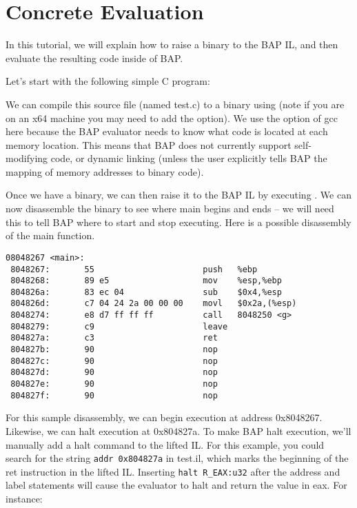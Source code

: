 \section{Concrete Evaluation}

In this tutorial, we will explain how to raise a binary to the BAP IL,
and then evaluate the resulting code inside of BAP.

Let's start with the following simple C program:


We can compile this source file (named test.c) to a binary using
 (note if you are on an x64 machine you may
need to add the  option).  We use the  option of
gcc here because the BAP evaluator needs to know what code is located
at each memory location. This means that BAP does not currently
support self-modifying code, or dynamic linking (unless the user
explicitly tells BAP the mapping of memory addresses to binary code).

Once we have a binary, we can then raise it to the BAP IL by executing
. We can now disassemble the binary
to see where main begins and ends -- we will need this to tell BAP
where to start and stop executing. Here is a possible disassembly of
the main function.

\begin{verbatim}
08048267 <main>:
 8048267:       55                      push   %ebp
 8048268:       89 e5                   mov    %esp,%ebp
 804826a:       83 ec 04                sub    $0x4,%esp
 804826d:       c7 04 24 2a 00 00 00    movl   $0x2a,(%esp)
 8048274:       e8 d7 ff ff ff          call   8048250 <g>
 8048279:       c9                      leave  
 804827a:       c3                      ret    
 804827b:       90                      nop
 804827c:       90                      nop
 804827d:       90                      nop
 804827e:       90                      nop
 804827f:       90                      nop
\end{verbatim}

For this sample disassembly, we can begin execution at address
0x8048267.  Likewise, we can halt execution at 0x804827a.  To make BAP
halt execution, we'll manually add a halt command to the lifted IL.
For this example, you could search for the string
\verb!addr 0x804827a! in test.il, which marks the beginning of the ret
instruction in the lifted IL.  Inserting \verb!halt R_EAX:u32!  after
the address and label statements will cause the evaluator to halt and
return the value in eax.  For instance:

